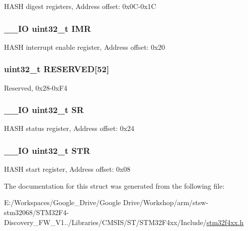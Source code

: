 H\-A\-S\-H digest registers, Address offset\-: 0x0\-C-\/0x1\-C \hypertarget{struct_h_a_s_h___type_def_ae845b86e973b4bf8a33c447c261633f6}{
\subsubsection[{I\-M\-R}]{\setlength{\rightskip}{0pt plus 5cm}\-\_\-\-\_\-\-I\-O uint32\-\_\-t I\-M\-R}}\label{struct_h_a_s_h___type_def_ae845b86e973b4bf8a33c447c261633f6}
H\-A\-S\-H interrupt enable register, Address offset\-: 0x20 \hypertarget{struct_h_a_s_h___type_def_a31675cbea6dc1b5f7de162884a4bb6eb}{
\subsubsection[{R\-E\-S\-E\-R\-V\-E\-D}]{\setlength{\rightskip}{0pt plus 5cm}uint32\-\_\-t R\-E\-S\-E\-R\-V\-E\-D\mbox{[}52\mbox{]}}}\label{struct_h_a_s_h___type_def_a31675cbea6dc1b5f7de162884a4bb6eb}
Reserved, 0x28-\/0x\-F4 \hypertarget{struct_h_a_s_h___type_def_af6aca2bbd40c0fb6df7c3aebe224a360}{
\subsubsection[{S\-R}]{\setlength{\rightskip}{0pt plus 5cm}\-\_\-\-\_\-\-I\-O uint32\-\_\-t S\-R}}\label{struct_h_a_s_h___type_def_af6aca2bbd40c0fb6df7c3aebe224a360}
H\-A\-S\-H status register, Address offset\-: 0x24 \hypertarget{struct_h_a_s_h___type_def_a7060ac1ed928ee931d7664650f2dcf75}{
\subsubsection[{S\-T\-R}]{\setlength{\rightskip}{0pt plus 5cm}\-\_\-\-\_\-\-I\-O uint32\-\_\-t S\-T\-R}}\label{struct_h_a_s_h___type_def_a7060ac1ed928ee931d7664650f2dcf75}
H\-A\-S\-H start register, Address offset\-: 0x08 

The documentation for this struct was generated from the following file\-:\begin{DoxyCompactItemize}
\item 
E\-:/\-Workspaces/\-Google\-\_\-\-Drive/\-Google Drive/\-Workshop/arm/stsw-\/stm32068/\-S\-T\-M32\-F4-\/\-Discovery\-\_\-\-F\-W\-\_\-\-V1../\-Libraries/\-C\-M\-S\-I\-S/\-S\-T/\-S\-T\-M32\-F4xx/\-Include/\hyperlink{stm32f4xx_8h}{stm32f4xx.\-h}\end{DoxyCompactItemize}
